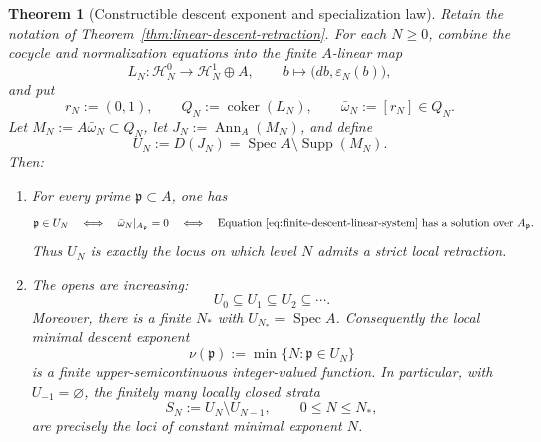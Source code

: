 \documentclass[11pt]{article}
\newtheorem{theorem}{Theorem}[section]
\theoremstyle{definition}
\begin{document}
\begin{theorem}[Constructible descent exponent and specialization law]\label{thm:descent-exponent-stratification}
Retain the notation of Theorem~\ref{thm:linear-descent-retraction}.  For each
$N\geq0$, combine the cocycle and normalization equations into the finite
$A$-linear map
\begin{equation}\label{eq:descent-augmented-linear-map}
 L_N:\mathcal H_N^0\longrightarrow \mathcal H_N^1\oplus A,
 \qquad
 b\longmapsto\bigl(db,\varepsilon_N(b)\bigr),
\end{equation}
and put
\[
 r_N:=(0,1),\qquad
 Q_N:=\operatorname{coker}(L_N),\qquad
 \bar\omega_N:=[r_N]\in Q_N.
\]
Let $M_N:=A\bar\omega_N\subset Q_N$, let
$J_N:=\operatorname{Ann}_A(M_N)$, and define
\begin{equation}\label{eq:descent-exponent-open}
 U_N:=D(J_N)=\operatorname{Spec}A\setminus\operatorname{Supp}(M_N).
\end{equation}
Then:

\begin{enumerate}[label=\textnormal{(\roman*)}]
\item For every prime $\mathfrak p\subset A$, one has
\begin{equation}\label{eq:local-descent-stage-criterion}
 \mathfrak p\in U_N
 \quad\Longleftrightarrow\quad
 \bar\omega_N|_{A_{\mathfrak p}}=0
 \quad\Longleftrightarrow\quad
 \text{Equation~\eqref{eq:finite-descent-linear-system} has a solution over }
 A_{\mathfrak p}.
\end{equation}
Thus $U_N$ is exactly the locus on which level $N$ admits a strict local
retraction.

\item The opens are increasing:
\begin{equation}\label{eq:descent-exponent-open-filtration}
 U_0\subseteq U_1\subseteq U_2\subseteq\cdots.
\end{equation}
Moreover, there is a finite $N_*$ with $U_{N_*}=\operatorname{Spec}A$.
Consequently the local minimal descent exponent
\begin{equation}\label{eq:minimal-local-descent-exponent}
 \nu(\mathfrak p):=\min\{N:\mathfrak p\in U_N\}
\end{equation}
is a finite upper-semicontinuous integer-valued function.  In particular,
with $U_{-1}=\varnothing$, the finitely many locally closed strata
\begin{equation}\label{eq:descent-exponent-strata}
 S_N:=U_N\setminus U_{N-1},
 \qquad 0\leq N\leq N_*,
\end{equation}
are precisely the loci of constant minimal exponent $N$.


\end{enumerate}
\end{theorem}
\end{document}
